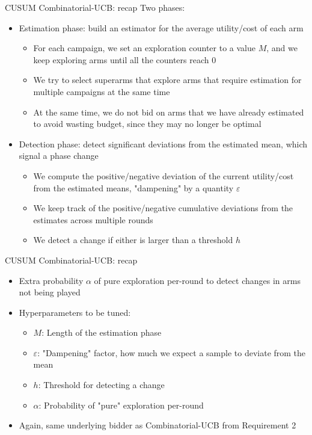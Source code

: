 \begin{frame}{CUSUM Combinatorial-UCB: recap}
    Two phases:
    \begin{itemize}
        \item Estimation phase: build an estimator for the average utility/cost of each arm
        \begin{itemize}
            \item For each campaign, we set an exploration counter to a value $M$, and we keep exploring arms until all the counters reach $0$
            \item We try to select superarms that explore arms that require estimation for multiple campaigns at the same time
            \item At the same time, we do not bid on arms that we have already estimated to avoid wasting budget, since they may no longer be optimal
        \end{itemize}

        \item Detection phase: detect significant deviations from the estimated mean, which signal a phase change
        \begin{itemize}
            \item We compute the positive/negative deviation of the current utility/cost from the estimated means, "dampening" by a quantity $\varepsilon$
            \item We keep track of the positive/negative cumulative deviations from the estimates across multiple rounds
            \item We detect a change if either is larger than a threshold $h$
        \end{itemize}
    \end{itemize}
\end{frame}

\begin{frame}{CUSUM Combinatorial-UCB: recap}
    \begin{itemize}        
        \item Extra probability $\alpha$ of pure exploration per-round to detect changes in arms not being played
        \item Hyperparameters to be tuned: 
        \begin{itemize}
            \item $M$: Length of the estimation phase
            \item $\varepsilon$: "Dampening" factor, how much we expect a sample to deviate from the mean
            \item $h$: Threshold for detecting a change 
            \item $\alpha$: Probability of "pure" exploration per-round  
        \end{itemize}

        \item Again, same underlying bidder as Combinatorial-UCB from Requirement 2
    \end{itemize}
\end{frame}

